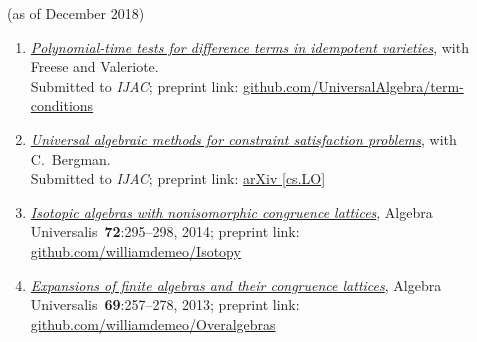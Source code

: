 \documentclass{article}
\begin{document}
\thispagestyle{empty}

 (as of December 2018)

\vskip1cm
    \begin{enumerate}
    \item \href{https://github.com/UniversalAlgebra/term-conditions/tree/master/ijac}{{\it Polynomial-time tests for difference terms in idempotent varieties}},
      with Freese and Valeriote.\\
      Submitted to {\small {\it IJAC}}; preprint link: \href{https://github.com/UniversalAlgebra/term-conditions/tree/master/DiffTerm}{github.com/UniversalAlgebra/term-conditions}

    \item \href{https://goo.gl/nXC1i9} %
         {{\it Universal algebraic methods for constraint satisfaction problems}},
         with C.~Bergman.\\
         Submitted to {\small {\it IJAC}};
         preprint link: \href{https://arxiv.org/abs/1611.02867}{arXiv [cs.LO]}

    \item \href{https://github.com/williamdemeo/Isotopy}{{\it Isotopic algebras with nonisomorphic congruence lattices}},
    Algebra Universalis~{\bf 72}:295--298, 2014; 
         preprint link: \href{https://github.com/williamdemeo/Isotopy}{github.com/williamdemeo/Isotopy}

    \item \href{https://github.com/williamdemeo/Overalgebras}{{\it Expansions of finite algebras and their congruence lattices}},
    Algebra Universalis~{\bf 69}:257--278, 2013; preprint link: \href{https://github.com/williamdemeo/Overalgebras}{github.com/williamdemeo/Overalgebras}
    \end{enumerate}

    \vskip1cm
\end{document}
